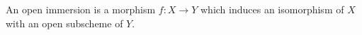 An open immersion is a morphism $f: X \rightarrow Y$ which induces an isomorphism of $X$ with an open subscheme of $Y$.
